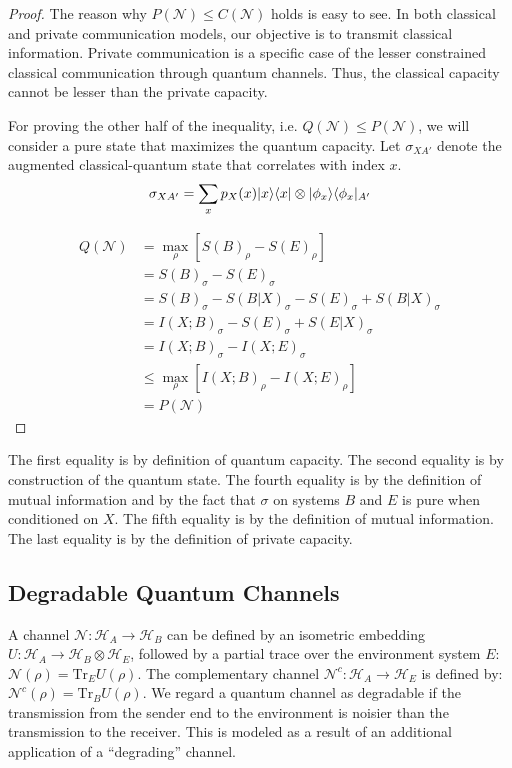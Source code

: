 \begin{proof}
The reason why $P(\mathcal{N}) \leq C(\mathcal{N})$ holds is easy to see. In both classical and private communication models, our objective is to transmit classical information. Private communication is a specific case of the lesser constrained classical communication through quantum channels. Thus, the classical capacity cannot be lesser than the private capacity.

For proving the other half of the inequality, i.e. $Q(\mathcal{N}) \leq P(\mathcal{N})$, we will consider a pure state that maximizes the quantum capacity. Let $\sigma_{XA'}$ denote the augmented classical-quantum state that correlates with index $x$.
$$\sigma_{XA'} = \sum_{x} p_X(x) \lvert x\rangle\langle x\rvert \otimes \lvert\phi_x\rangle\langle\phi_x\rvert_{A'}$$

\begin{align*}
Q(\mathcal{N}) &= \max_{\rho} \left[ S(B)_{\rho} - S(E)_{\rho} \right] \\
&= S(B)_{\sigma} - S(E)_{\sigma} \\
&= S(B)_{\sigma} - S(B|X)_{\sigma} - S(E)_{\sigma} + S(B|X)_{\sigma} \\
&= I(X;B)_{\sigma} - S(E)_{\sigma} + S(E|X)_{\sigma} \\
&= I(X;B)_{\sigma} - I(X;E)_{\sigma} \\
&\leq \max_{\rho} \left[ I(X;B)_{\rho} - I(X;E)_{\rho} \right] \\
&= P(\mathcal{N})
\end{align*}
\end{proof}

The first equality is by definition of quantum capacity. The second equality is by construction of the quantum state. The fourth equality is by the definition of mutual information and by the fact that $\sigma$ on systems $B$ and $E$ is pure when conditioned on $X$. The fifth equality is by the definition of mutual information. The last equality is by the definition of private capacity.

\subsection{Degradable Quantum Channels}

A channel $\mathcal{N}: \mathcal{H}_A \rightarrow \mathcal{H}_B$ can be defined by an isometric embedding $U: \mathcal{H}_A \rightarrow \mathcal{H}_B \otimes \mathcal{H}_E$, followed by a partial trace over the environment system $E$: $\mathcal{N}(\rho) = \mathrm{Tr}_E U(\rho)$. The complementary channel $\mathcal{N}^c: \mathcal{H}_A \rightarrow \mathcal{H}_E$ is defined by: $\mathcal{N}^c(\rho) = \mathrm{Tr}_B U(\rho)$. We regard a quantum channel as degradable if the transmission from the sender end to the environment is noisier than the transmission to the receiver. This is modeled as a result of an additional application of a ``degrading'' channel.

